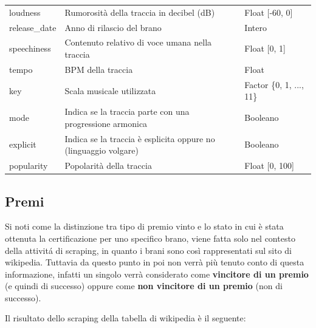 \begin{center}
{\begin{tabular}[H]{ |l|l|l| }
			loudness & 
			Rumorosità della traccia in decibel (dB) &
			Float [-60, 0]\\
			
			release\_date & 
			Anno di rilascio del brano&
			Intero\\
			
			speechiness & 
			Contenuto relativo di voce umana nella traccia &
			Float [0, 1]\\
			
			tempo & 
			BPM della traccia &
			Float\\
			
			key & 
			Scala musicale utilizzata &
			Factor \{0, 1, ..., 11\}\\
			
			mode & 
			Indica se la traccia parte con una progressione armonica &
			Booleano\\
			
			explicit & 
			Indica se la traccia è esplicita oppure no (linguaggio volgare) &
			Booleano\\
			
			popularity & 
			Popolarità della traccia &
			Float [0, 100]\\
			
			\hline
			
		\end{tabular}
	}
\end{center}

\subsection{Premi}
Si noti come la distinzione tra tipo di premio vinto e lo stato in cui
è stata ottenuta la certificazione per uno specifico brano, viene
fatta solo nel contesto della attivitá di scraping, in quanto i brani
sono così rappresentati sul sito di wikipedia. Tuttavia da questo
punto in poi non verrà più tenuto conto di questa informazione,
infatti un singolo verrà considerato come\textbf{ vincitore di un
  premio} (e quindi di successo) oppure come \textbf{non vincitore di
  un premio} (non di successo).

Il risultato dello scraping della tabella di wikipedia è il seguente:

